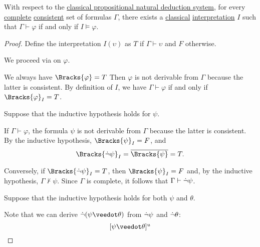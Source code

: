 \begin{proposition}\label{thm:consistent_implies_satisfiable_interpretation}
  With respect to the \hyperref[def:abstract_natural_deduction_system]{classical propositional natural deduction system}, for every \hyperref[def:complete_set_of_sentences]{complete} \hyperref[def:consistent_set_of_sentences]{consistent} set of formulas \( \Gamma \), there exists a \hyperref[def:propositional_semantics/classical]{classical} \hyperref[def:propositional_valuation/interpretation]{interpretation} \( I \) such that \( \Gamma \vdash \varphi \) if and only if \( I \vDash \varphi \).
\end{proposition}
\begin{proof}
  Define the interpretation \( I(\upsilon) \) as \( T \) if \( \Gamma \vdash \upsilon \) and \( F \) otherwise.

  We proceed via  on \( \varphi \).

   We always have \( \Bracks{\varphi} = T \)
   Then \( \varphi \) is not derivable from \( \Gamma \) because the latter is consistent.
   By definition of \( I \), we have \( \Gamma \vdash \varphi \) if and only if \( \Bracks{\varphi}_I = T \).

   Suppose that the inductive hypothesis holds for \( \psi \).

  \SufficiencySubProof* If \( \Gamma \vdash \varphi \), the formula \( \psi \) is not derivable from \( \Gamma \) because the latter is consistent. By the inductive hypothesis, \( \Bracks{\psi}_I = F \), and
  \begin{equation*}
    \Bracks{\synneg \psi}_I = \oline{\Bracks{\psi}} = T.
  \end{equation*}

  \NecessitySubProof* Conversely, if \( \Bracks{\synneg \psi}_I = T \), then \( \Bracks{\psi}_I = F \) and, by the inductive hypothesis, \( \Gamma \not\vdash \psi \). Since \( \Gamma \) is complete, it follows that \( \Gamma \vdash \dot{\neg} \psi \).

   Suppose that the inductive hypothesis holds for both \( \psi \) and \( \theta \).

  Note that we can derive \( \synneg (\psi \synvee \theta) \) from \( \dot{\neg} \psi \) and \( \dot{\neg} \theta \):
  \begin{equation*}
    \begin{prooftree}
      \hypo{ [\psi \synvee \theta]^u }


\end{prooftree}
\end{equation*}
\end{proof}
